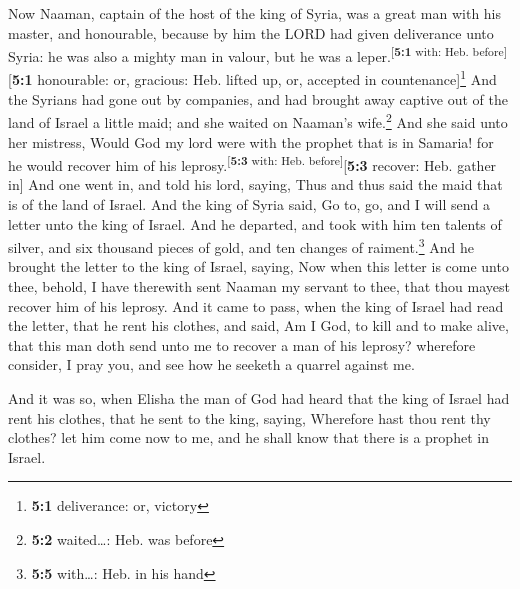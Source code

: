  Now Naaman, captain of the host of the king of Syria, was
a great man with his master, and honourable, because by him the LORD had
given deliverance unto Syria: he was also a mighty man in valour, but he
was a leper.\textsuperscript{{[}\textbf{5:1} with: Heb.
before{]}}{[}\textbf{5:1} honourable: or, gracious: Heb. lifted up, or,
accepted in countenance{]}\footnote{\textbf{5:1} deliverance: or,
  victory}  And the Syrians had gone out by companies, and
had brought away captive out of the land of Israel a little maid; and
she waited on Naaman's wife.\footnote{\textbf{5:2} waited\ldots: Heb.
  was before}  And she said unto her mistress, Would God
my lord were with the prophet that is in Samaria! for he would recover
him of his leprosy.\textsuperscript{{[}\textbf{5:3} with: Heb.
before{]}}{[}\textbf{5:3} recover: Heb. gather in{]}  And
one went in, and told his lord, saying, Thus and thus said the maid that
is of the land of Israel.  And the king of Syria said, Go
to, go, and I will send a letter unto the king of Israel. And he
departed, and took with him ten talents of silver, and six thousand
pieces of gold, and ten changes of raiment.\footnote{\textbf{5:5}
  with\ldots: Heb. in his hand}  And he brought the letter
to the king of Israel, saying, Now when this letter is come unto thee,
behold, I have therewith sent Naaman my servant to thee, that thou
mayest recover him of his leprosy.  And it came to pass,
when the king of Israel had read the letter, that he rent his clothes,
and said, Am I God, to kill and to make alive, that this man doth send
unto me to recover a man of his leprosy? wherefore consider, I pray you,
and see how he seeketh a quarrel against me.

 And it was so, when Elisha the man of God had heard that
the king of Israel had rent his clothes, that he sent to the king,
saying, Wherefore hast thou rent thy clothes? let him come now to me,
and he shall know that there is a prophet in Israel.

